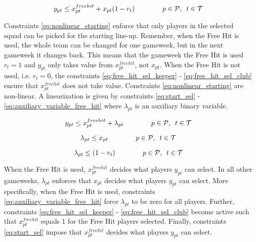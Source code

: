 \begin{equation} \label{eq:nonlinear_starting}
    y_{pt} \leq x_{pt}^{free hit} + x_{pt}(1-r_{t}) \qquad\qquad  p \in \mathcal{P}, \enskip t \in \mathcal{T}
\end{equation}

Constraints \eqref{eq:nonlinear_starting} enforce that only players in the selected squad can be picked for the starting line-up. Remember, when the Free Hit is used, the whole team can be changed for one gameweek, but in the next gameweek it changes back. This means that the gameweek the Free Hit is used $r_{t} = 1$ and $y_{pt}$ only takes value from $x_{pt}^{free hit}$, not $x_{pt}$. When the Free Hit is not used, i.e. $r_{t} = 0$, the constraints \eqref{eq:free_hit_sel_keeper} - \eqref{eq:free_hit_sel_club} ensure that $x_{pt}^{free hit}$ does not take value. Constraints \eqref{eq:nonlinear_starting} are non-linear. A linearization is given by constraints \eqref{eq:start_sel} - \eqref{eq:auxiliary_variable_free_hit} where $\lambda_{pt}$ is an auxiliary binary variable.


\begin{equation}\label{eq:start_sel}
    y_{pt} \leq x_{pt}^{free hit} + \lambda_{pt} \qquad\qquad  p \in \mathcal{P}, \enskip t \in \mathcal{T}
\end{equation}

\begin{equation} \label{eq:auxiliary_variable_x}
    \lambda_{pt} \leq {x}_{pt}  \qquad\qquad  p \in \mathcal{P}, \enskip t \in \mathcal{T}
\end{equation}

\begin{equation} \label{eq:auxiliary_variable_free_hit}
    \lambda_{pt} \leq (1-r_{t}) \qquad\qquad  p \in \mathcal{P}, \enskip t \in \mathcal{T}
\end{equation}

When the Free Hit is used, $x_{pt}^{freehit}$ decides what players $y_{pt}$ can select. In all other gameweeks, $\lambda_{pt}$ enforces that $x_{pt}$ decides what players $y_{pt}$ can select. More specifically, when the Free Hit is used, constraints \eqref{eq:auxiliary_variable_free_hit} force $\lambda_{pt}$ to be zero for all players. Further, constraints \eqref{eq:free_hit_sel_keeper} - \eqref{eq:free_hit_sel_club} become active such that $x_{pt}^{freehit}$ equals 1 for the Free Hit players selected. Finally, constraints \eqref{eq:start_sel} impose that $x_{pt}^{freehit}$ decides what players $y_{pt}$ can select. 

